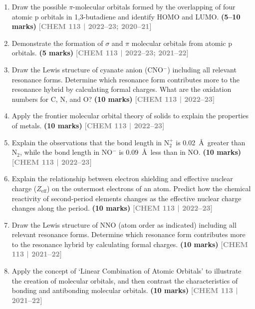 \documentclass[12pt,a3paper]{article}
\newcommand{\yr}[1]{\hfill\textcolor{gray}{\small\textbf{[#1]}}}
\newcommand{\mk}[1]{\textcolor{orange!70!black}{\small\textbf{(#1 marks)}}}
\begin{document}
\begin{enumerate}
\item Draw the possible $\pi$-molecular orbitals formed by the overlapping of four atomic p orbitals in 1,3-butadiene and identify HOMO and LUMO. \mk{5--10}
\yr{CHEM 113 | 2022--23; 2020--21}



\item Demonstrate the formation of $\sigma$ and $\pi$ molecular orbitals from atomic p orbitals. \mk{5}
\yr{CHEM 113 | 2022--23; 2021--22}




\item Draw the Lewis structure of cyanate anion (CNO$^-$) including all relevant resonance forms. Determine which resonance form contributes more to the resonance hybrid by calculating formal charges. What are the oxidation numbers for C, N, and O? \mk{10}
\yr{CHEM 113 | 2022--23}



\item Apply the frontier molecular orbital theory of solids to explain the properties of metals. \mk{10}
\yr{CHEM 113 | 2022--23}



\item Explain the observations that the bond length in N$_2^+$ is 0.02~\AA\ greater than N$_2$, while the bond length in NO$^-$ is 0.09~\AA\ less than in NO. \mk{10}
\yr{CHEM 113 | 2022--23}




\item Explain the relationship between electron shielding and effective nuclear charge ($Z_{\text{eff}}$) on the outermost electrons of an atom. Predict how the chemical reactivity of second-period elements changes as the effective nuclear charge changes along the period. \mk{10}
\yr{CHEM 113 | 2022--23}




\item Draw the Lewis structure of NNO (atom order as indicated) including all relevant resonance forms. Determine which resonance form contributes more to the resonance hybrid by calculating formal charges. \mk{10}
\yr{CHEM 113 | 2021--22}



\item Apply the concept of `Linear Combination of Atomic Orbitals' to illustrate the creation of molecular orbitals, and then contrast the characteristics of bonding and antibonding molecular orbitals. \mk{10}
\yr{CHEM 113 | 2021--22}




\end{enumerate}
\end{document}
